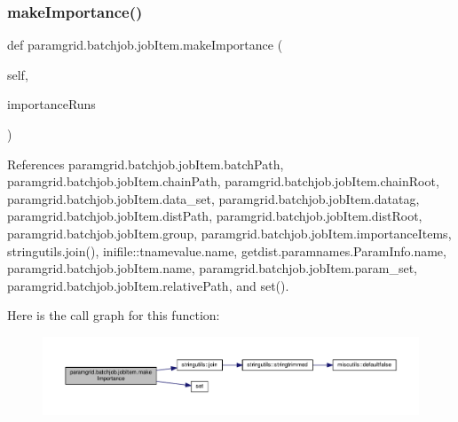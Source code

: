 \mbox{\label{classparamgrid_1_1batchjob_1_1jobItem_afca4f33b01300cd113f3ec9206d61da6}} 
\subsubsection{\texorpdfstring{make\+Importance()}{makeImportance()}}
{\footnotesize\ttfamily def paramgrid.\+batchjob.\+job\+Item.\+make\+Importance (\begin{DoxyParamCaption}\item[{}]{self,  }\item[{}]{importance\+Runs }\end{DoxyParamCaption})}



References paramgrid.\+batchjob.\+job\+Item.\+batch\+Path, paramgrid.\+batchjob.\+job\+Item.\+chain\+Path, paramgrid.\+batchjob.\+job\+Item.\+chain\+Root, paramgrid.\+batchjob.\+job\+Item.\+data\+\_\+set, paramgrid.\+batchjob.\+job\+Item.\+datatag, paramgrid.\+batchjob.\+job\+Item.\+dist\+Path, paramgrid.\+batchjob.\+job\+Item.\+dist\+Root, paramgrid.\+batchjob.\+job\+Item.\+group, paramgrid.\+batchjob.\+job\+Item.\+importance\+Items, stringutils.\+join(), inifile\+::tnamevalue.\+name, getdist.\+paramnames.\+Param\+Info.\+name, paramgrid.\+batchjob.\+job\+Item.\+name, paramgrid.\+batchjob.\+job\+Item.\+param\+\_\+set, paramgrid.\+batchjob.\+job\+Item.\+relative\+Path, and set().

Here is the call graph for this function\+:
\nopagebreak
\begin{figure}[H]
\begin{center}
\leavevmode
\includegraphics[width=350pt]{classparamgrid_1_1batchjob_1_1jobItem_afca4f33b01300cd113f3ec9206d61da6_cgraph}
\end{center}
\end{figure}
\mbox{\label{classparamgrid_1_1batchjob_1_1jobItem_a00fa8cb2fb3cfd794d9ec31cc44a0e2d}} 
